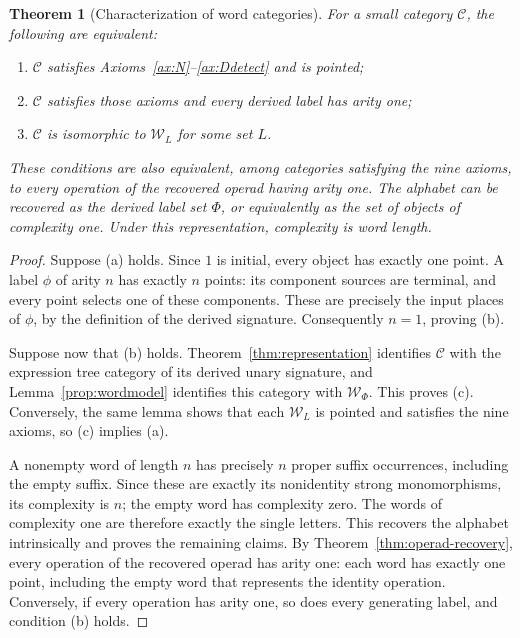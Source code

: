 \documentclass[11pt,a4paper]{article}
\theoremstyle{plain}
\newtheorem{theorem}{Theorem}[section]
\theoremstyle{definition}
\theoremstyle{remark}
\newcommand{\C}{\mathcal C}
\newcommand{\one}{1}
\begin{document}
\begin{theorem}[Characterization of word categories]\label{thm:wordcharacterization}
For a small category $\C$, the following are equivalent:
\begin{enumerate}
\item $\C$ satisfies Axioms~\ref{ax:N}--\ref{ax:Ddetect} and is pointed;
\item $\C$ satisfies those axioms and every derived label has arity one;
\item $\C$ is isomorphic to $\mathcal W_L$ for some set $L$.
\end{enumerate}
These conditions are also equivalent, among categories satisfying
the nine axioms, to every operation of the recovered operad having
arity one. The alphabet can be recovered as the derived label set
$\Phi$, or equivalently as the set of objects of complexity one.
Under this representation, complexity is word length.
\end{theorem}
\begin{proof}
Suppose \textup{(a)} holds. Since $\one$ is initial, every object has exactly
one point. A label $\phi$ of arity $n$ has exactly $n$ points:
its component sources are terminal, and every point selects one
of these components. These are precisely the input places of
$\phi$, by the definition of the derived signature.
Consequently $n=1$, proving \textup{(b)}.

Suppose now that \textup{(b)} holds.
Theorem~\ref{thm:representation} identifies $\C$ with the
expression tree category of its derived unary signature, and
Lemma~\ref{prop:wordmodel} identifies this category with
$\mathcal W_\Phi$. This proves \textup{(c)}. Conversely, the
same lemma shows that each $\mathcal W_L$ is pointed and
satisfies the nine axioms, so \textup{(c)} implies \textup{(a)}.

A nonempty word of length $n$ has precisely $n$ proper suffix occurrences,
including the empty suffix. Since these are exactly its nonidentity
strong monomorphisms, its complexity is $n$; the empty word has
complexity zero. The words of complexity
one are therefore exactly the single letters. This recovers the
alphabet intrinsically and proves the remaining claims. By
Theorem~\ref{thm:operad-recovery}, every operation of the recovered
operad has arity one: each word has exactly one point, including
the empty word that represents the identity operation. Conversely,
if every operation has arity one, so does every generating label,
and condition \textup{(b)} holds.
\end{proof}
\end{document}

